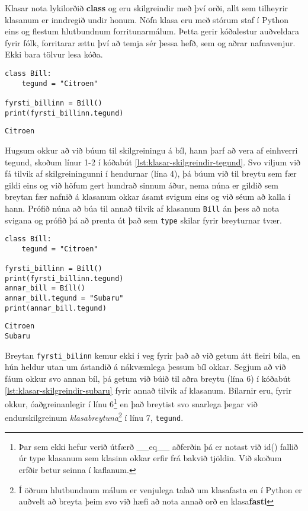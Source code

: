 Klasar nota lykilorðið \textbf{class} og eru skilgreindir með því orði, allt sem tilheyrir klasanum er inndregið undir honum.
Nöfn klasa eru með stórum staf í Python eins og flestum hlutbundnum forritunarmálum.
Þetta gerir kóðalestur auðveldara fyrir fólk, forritarar ættu því að temja sér þessa hefð, sem og aðrar nafnavenjur.
Ekki bara tölvur lesa kóða.

\begin{lstlisting}[caption=Klasinn Bíll skilgreindur, label=lst:klasar-skilgreindir-tegund]
class Bíll:
	tegund = "Citroen"

fyrsti_billinn = Bíll()
print(fyrsti_billinn.tegund)
\end{lstlisting}
\lstset{style=uttak}
\begin{lstlisting}
Citroen
\end{lstlisting}
\lstset{style=venjulegt}

Hugsum okkur að við búum til skilgreiningu á bíl, hann þarf að vera af einhverri tegund, skoðum línur 1-2 í kóðabút \ref{lst:klasar-skilgreindir-tegund}.
Svo viljum við fá tilvik af skilgreiningunni í hendurnar (lína 4), þá búum við til breytu sem fær gildi eins og við höfum gert hundrað sinnum áður, nema núna er gildið sem breytan fær nafnið á klasanum okkar ásamt svigum eins og við séum að kalla í hann.
Prófið núna að búa til annað tilvik af klasanum \texttt{Bíll} án þess að nota svigana og prófið þá að prenta út það sem \texttt{type} skilar fyrir breyturnar tvær.

\begin{lstlisting}[caption=Klasinn Bíll skilgreindur og tvö tilvik búin til, label=lst:klasar-skilgreindir-subaru]
class Bíll:
	tegund = "Citroen"
	
fyrsti_billinn = Bíll()
print(fyrsti_billinn.tegund)
annar_bill = Bíll()
annar_bill.tegund = "Subaru"
print(annar_bill.tegund)
\end{lstlisting}
\lstset{style=uttak}
\begin{lstlisting}
Citroen
Subaru
\end{lstlisting}
\lstset{style=venjulegt}

Breytan \texttt{fyrsti\_bilinn} kemur ekki í veg fyrir það að við getum átt fleiri bíla, en hún heldur utan um ástandið á nákvæmlega þessum bíl okkar.
Segjum að við fáum okkur svo annan bíl, þá getum við búið til aðra breytu (lína 6) í kóðabút \ref{lst:klasar-skilgreindir-subaru} fyrir annað tilvik af klasanum.
Bílarnir eru, fyrir okkur, óaðgreinanlegir í línu 6\footnote{Þar sem ekki hefur verið útfærð \_\_eq\_\_ aðferðin þá er notast við id() fallið úr type klasanum sem klasinn okkar erfir frá bakvið tjöldin.
Við skoðum erfðir betur seinna í kaflanum.} en það breytist svo snarlega þegar við endurskilgreinum \emph{klasabreytuna}\footnote{Í öðrum hlutbundnum málum er venjulega talað um klasafasta en í Python er auðvelt að breyta þeim svo við hæfi að nota annað orð en klasa\textbf{fasti}} í línu 7, \texttt{tegund}.

